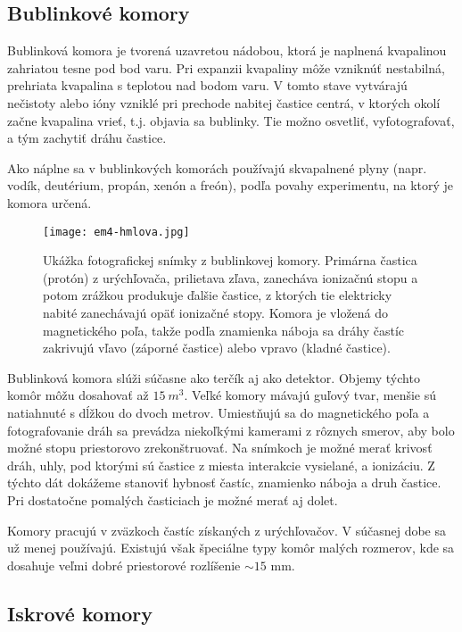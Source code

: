 \documentclass[../../main.tex]{subfiles}
\begin{document}
\subsection{Bublinkové komory}

Bublinková komora je tvorená uzavretou nádobou, ktorá je naplnená kvapalinou zahriatou tesne pod bod varu. Pri expanzii kvapaliny môže vzniknúť nestabilná, prehriata kvapalina s teplotou nad bodom varu. V tomto stave vytvárajú nečistoty alebo ióny vzniklé pri prechode nabitej častice centrá, v ktorých okolí začne kvapalina vrieť, t.j. objavia sa bublinky. Tie možno osvetliť, vyfotografovať, a tým zachytiť dráhu častice.

Ako náplne sa v bublinkových komorách používajú skvapalnené plyny (napr. vodík, deutérium, propán, xenón a freón), podľa povahy experimentu, na ktorý je komora určená.

\begin{figure}[h]
\centering
\texttt{[image: em4-hmlova.jpg]}
\caption{Ukážka fotografickej snímky z bublinkovej komory. Primárna častica (protón) z urýchľovača, prilietava zľava, zanecháva ionizačnú stopu a potom zrážkou produkuje ďalšie častice, z ktorých tie elektricky nabité zanechávajú opäť ionizačné stopy. Komora je vložená do magnetického poľa, takže podľa znamienka náboja sa dráhy častíc zakrivujú vľavo (záporné častice) alebo vpravo (kladné častice).}
\label{em4:img:hmlova}
\end{figure}

 Bublinková komora slúži súčasne ako terčík  aj ako detektor. Objemy týchto komôr môžu dosahovať až $15\:\unit{m^3}$. Veľké komory mávajú guľový tvar, menšie sú natiahnuté s dĺžkou do dvoch metrov. Umiestňujú sa do magnetického poľa a fotografovanie dráh sa prevádza niekoľkými kamerami z rôznych smerov, aby bolo možné stopu priestorovo zrekonštruovať. Na snímkoch je možné merať krivosť dráh, uhly, pod ktorými sú častice z miesta interakcie vysielané, a ionizáciu. Z týchto dát dokážeme stanoviť hybnosť častíc, znamienko náboja a druh častice. Pri dostatočne pomalých časticiach je možné merať aj dolet.
 
 Komory pracujú v zväzkoch častíc získaných z urýchľovačov. V súčasnej dobe sa už menej používajú. Existujú však špeciálne typy komôr malých rozmerov, kde sa dosahuje veľmi dobré priestorové rozlíšenie $\sim 15$ mm.

\subsection{Iskrové komory}
\end{document}
